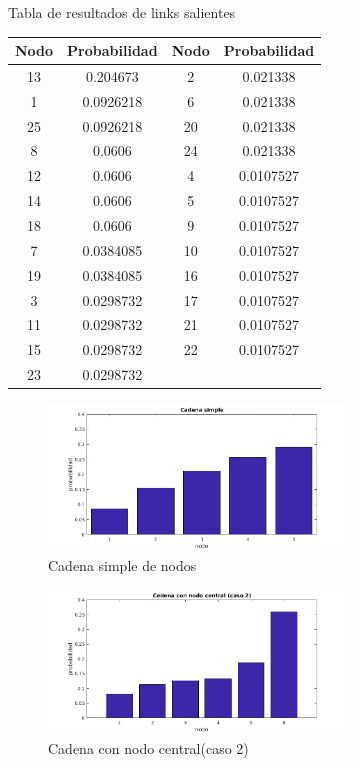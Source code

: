 Tabla de resultados de links salientes
\begin{table}
	\begin{tabular}{|c|c|c|c|}
		\hline
		Nodo & Probabilidad & Nodo & Probabilidad \\ \hline
		13   & 0.204673     & 2    & 0.021338     \\
		1    & 0.0926218    & 6    & 0.021338     \\
		25   & 0.0926218    & 20   & 0.021338     \\
		8    & 0.0606       & 24   & 0.021338     \\
		12   & 0.0606       & 4    & 0.0107527    \\
		14   & 0.0606       & 5    & 0.0107527    \\
		18   & 0.0606       & 9    & 0.0107527    \\
		7    & 0.0384085    & 10   & 0.0107527    \\
		19   & 0.0384085    & 16   & 0.0107527    \\
		3    & 0.0298732    & 17   & 0.0107527    \\
		11   & 0.0298732    & 21   & 0.0107527    \\
		15   & 0.0298732    & 22   & 0.0107527    \\
		23   & 0.0298732    & ~    & ~            \\ \hline
	\end{tabular}
\end{table}


\begin{figure}[H]
	\centering
	\includegraphics[width=0.7\textwidth]{img/barrascadena4.png}
	\caption{Cadena simple de nodos}
	\label{fig:Ranking cadena simple}
\end{figure}


\begin{figure}[H]
	\centering
	\includegraphics[width=0.7\textwidth]{img/cadena6v2.png}
	\caption{Cadena con nodo central(caso 2)}
	\label{fig:Ranking cadena con nodo central}
\end{figure}


